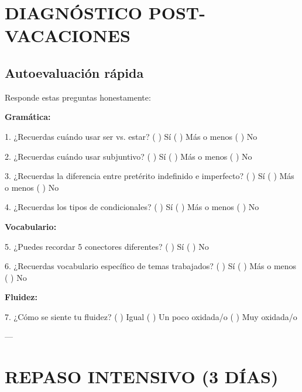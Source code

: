 \documentclass[a4paper,11pt]{article}
\begin{document}
\vspace{0.2cm}

\section{DIAGNÓSTICO POST-VACACIONES}

\vspace{0.2cm}

\subsection{Autoevaluación rápida}

\vspace{0.2cm}

Responde estas preguntas honestamente:

\vspace{0.2cm}

\textbf{Gramática:}

1. ¿Recuerdas cuándo usar ser vs. estar? ( ) Sí ( ) Más o menos ( ) No

2. ¿Recuerdas cuándo usar subjuntivo? ( ) Sí ( ) Más o menos ( ) No

3. ¿Recuerdas la diferencia entre pretérito indefinido e imperfecto? ( ) Sí ( ) Más o menos ( ) No

4. ¿Recuerdas los tipos de condicionales? ( ) Sí ( ) Más o menos ( ) No

\vspace{0.2cm}

\textbf{Vocabulario:}

5. ¿Puedes recordar 5 conectores diferentes? ( ) Sí ( ) No

6. ¿Recuerdas vocabulario específico de temas trabajados? ( ) Sí ( ) Más o menos ( ) No

\vspace{0.2cm}

\textbf{Fluidez:}

7. ¿Cómo se siente tu fluidez? ( ) Igual ( ) Un poco oxidada/o ( ) Muy oxidada/o

\vspace{0.2cm}

---

\vspace{0.2cm}

\section{REPASO INTENSIVO (3 DÍAS)}
\end{document}
